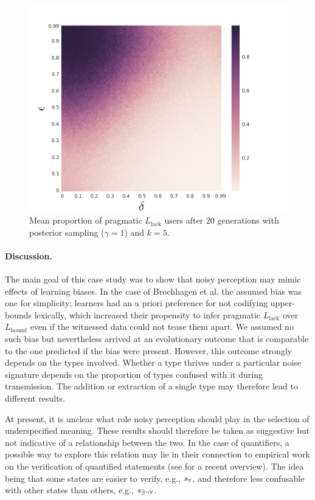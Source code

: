 \documentclass[10pt,a4paper]{article}
\newcommand{\state}{\ensuremath{s}\xspace}		%
\newcommand{\mystate}[1]{\ensuremath{\state_{\text{#1}}}\xspace} %
\newcommand{\ssome}{\mystate{\ensuremath{\exists\neg\forall}}}
\newcommand{\sall}{\mystate{\ensuremath{\forall}}}
\newcommand{\postparameter}{\ensuremath{\gamma}}
\begin{document}
\begin{figure}[ht]
\centering
    \includegraphics[scale=0.33]{../code/plots/quantifiers-posterior-sampling-k5.png}
  \caption{Mean proportion of pragmatic $L_{\text{lack}}$ users after $20$ generations with posterior sampling ($\postparameter = 1$) and $k = 5$.}
  \label{fig:quant}
\end{figure}


\paragraph{Discussion.} The main goal of this case study was to show that noisy perception may
mimic effects of learning biases. In the case of Brochhagen et al. the assumed bias was one
for simplicity; learners had an a priori preference for not codifying 
upper-bounds lexically, which increased their propensity to infer pragmatic
$L_{\text{lack}}$ over $L_{\text{bound}}$ even if the witnessed data could not tease them
apart. We assumed no such bias but nevertheless arrived at an evolutionary outcome that
is comparable to the one predicted if the bias were present. However, this outcome
strongly depends on the types involved. Whether a type thrives under a particular noise
signature depends on the proportion of types confused with it during transmission. The addition
or extraction of a single type may therefore lead to different results.

At present, it is unclear what role noisy perception should play in the selection of underspecified meaning. These results should therefore be taken as suggestive but not indicative of a relationship between the two. In the case of quantifiers, a possible way to explore this relation may lie in their connection to empirical work on the verification of quantified statements (see \citealt{szymanik:2016} for a recent overview). The idea being that some states are easier to verify, e.g., $\sall$, and therefore less confusable with other states than others, e.g., $\ssome$. 
\end{document}
